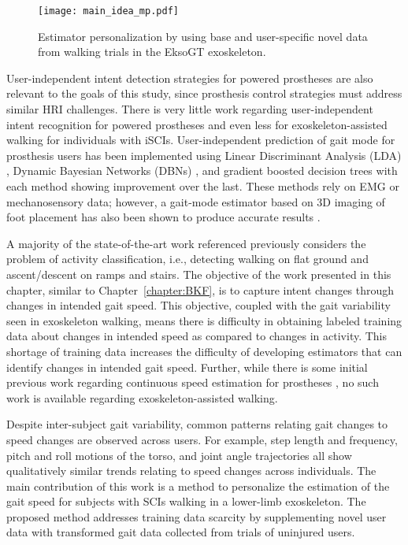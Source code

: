 \begin{figure}
	\centering
	\texttt{[image: main\_idea\_mp.pdf]}
	\caption{Estimator personalization by using base and user-specific novel data from walking trials in the EksoGT exoskeleton.}\label{fig:main_idea_mp}
\end{figure}

User-independent intent detection strategies for powered prostheses are also relevant to the goals of this study, since prosthesis control strategies must address similar HRI challenges. There is very little work regarding user-independent intent recognition for powered prostheses and even less for exoskeleton-assisted walking for individuals with iSCIs. User-independent prediction of gait mode for prosthesis users has been implemented using Linear Discriminant Analysis (LDA) \cite{young2013classifying}, Dynamic Bayesian Networks (DBNs) \cite{young2015classification}, and gradient boosted decision trees \cite{bhakta2020machine} with each method showing improvement over the last. These methods rely on EMG or mechanosensory data; however, a gait-mode estimator based on 3D imaging of foot placement has also been shown to produce accurate results \cite{massalin2017user}. 

A majority of the state-of-the-art work referenced previously considers the problem of activity classification, i.e., detecting walking on flat ground and ascent/descent on ramps and stairs. The objective of the work presented in this chapter, similar to Chapter~\ref{chapter:BKF}, is to capture intent changes through changes in intended gait speed. This objective, coupled with the gait variability seen in exoskeleton walking, means there is difficulty in obtaining labeled training data about changes in intended speed as compared to changes in activity. This shortage of training data increases the difficulty of developing estimators that can identify changes in intended gait speed. Further, while there is some initial previous work regarding continuous speed estimation for prostheses \cite{best2021phase}, no such work is available regarding exoskeleton-assisted walking.

Despite inter-subject gait variability, common patterns relating gait changes to speed changes are observed across users. For example, step length and frequency, pitch and roll motions of the torso, and joint angle trajectories all show qualitatively similar trends relating to speed changes across individuals. The main contribution of this work is a method to personalize the estimation of the gait speed for subjects with SCIs walking in a lower-limb exoskeleton. The proposed method addresses training data scarcity by supplementing novel user data with transformed gait data collected from trials of uninjured users. 

